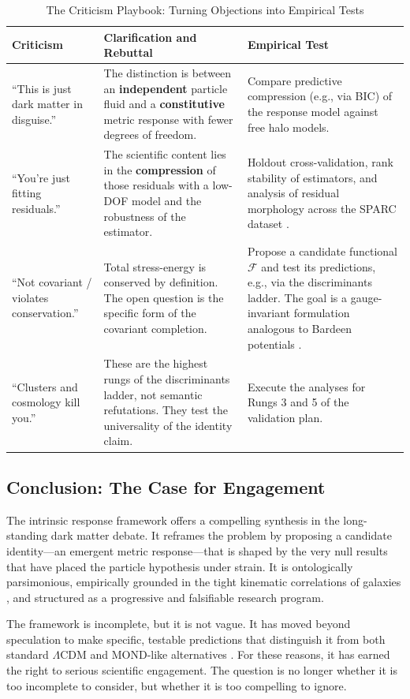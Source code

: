 \documentclass[12pt,onecolumn]{aastex631}
\begin{document}
\begin{table}[ht!]
\centering
\caption{The Criticism Playbook: Turning Objections into Empirical Tests}
\label{tab:playbook}
\begin{tabular}{p{4cm}p{7cm}p{5cm}}
\toprule
\textbf{Criticism} & \textbf{Clarification and Rebuttal} & \textbf{Empirical Test} \\
\midrule
“This is just dark matter in disguise.” & The distinction is between an \textbf{independent} particle fluid and a \textbf{constitutive} metric response with fewer degrees of freedom. & Compare predictive compression (e.g., via BIC) of the response model against free halo models. \\
“You’re just fitting residuals.” & The scientific content lies in the \textbf{compression} of those residuals with a low-DOF model and the robustness of the estimator. & Holdout cross-validation, rank stability of estimators, and analysis of residual morphology across the SPARC dataset \citep{Lelli2016}. \\
“Not covariant / violates conservation.” & Total stress-energy is conserved by definition. The open question is the specific form of the covariant completion. & Propose a candidate functional \(\mathcal{F}\) and test its predictions, e.g., via the discriminants ladder. The goal is a gauge-invariant formulation analogous to Bardeen potentials \citep{Bardeen1980}. \\
“Clusters and cosmology kill you.” & These are the highest rungs of the discriminants ladder, not semantic refutations. They test the universality of the identity claim. & Execute the analyses for Rungs 3 and 5 of the validation plan. \\
\bottomrule
\end{tabular}
\end{table}

\subsection{Conclusion: The Case for Engagement}
The intrinsic response framework offers a compelling synthesis in the long-standing dark matter debate. It reframes the problem by proposing a candidate identity—an emergent metric response—that is shaped by the very null results that have placed the particle hypothesis under strain. It is ontologically parsimonious, empirically grounded in the tight kinematic correlations of galaxies \citep{McGaugh2016}, and structured as a progressive and falsifiable research program.

The framework is incomplete, but it is not vague. It has moved beyond speculation to make specific, testable predictions that distinguish it from both standard \(\Lambda\)CDM and MOND-like alternatives \citep{Bullock2017, Verlinde2017}. For these reasons, it has earned the right to serious scientific engagement. The question is no longer whether it is too incomplete to consider, but whether it is too compelling to ignore.



\end{document}
